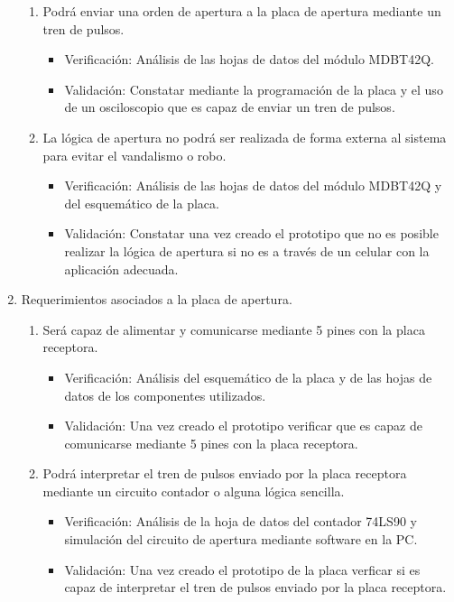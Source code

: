 \documentclass[11pt]{charter}
\begin{document}
\begin{enumerate}
\begin{enumerate}
	\item Podrá enviar una orden de apertura a la placa de apertura mediante un tren de pulsos.
		\begin{itemize}
		\item Verificación: Análisis de las hojas de datos del módulo MDBT42Q.
		\item Validación: Constatar mediante la programación de la placa y el uso de un osciloscopio que es capaz de enviar un tren de pulsos.
		\end{itemize}
		
			\item La lógica de apertura no podrá ser realizada de forma externa al sistema para evitar el vandalismo o robo.
		\begin{itemize}
		\item Verificación: Análisis de las hojas de datos del módulo MDBT42Q y del esquemático de la placa.
		\item Validación: Constatar una vez creado el prototipo que no es posible realizar la lógica de apertura si no es a través de un celular con la aplicación adecuada.
		\end{itemize}
	\end{enumerate}
	
\item Requerimientos asociados a la placa de apertura.
	\begin{enumerate}
	\item Será capaz de alimentar y comunicarse mediante 5 pines con la placa receptora.
		\begin{itemize}
		\item Verificación: Análisis del esquemático de la placa y de las hojas de datos de los componentes utilizados. 
		\item Validación: Una vez creado el prototipo verificar que es capaz de comunicarse mediante 5 pines con la placa receptora.
		\end{itemize}

	\item Podrá interpretar el tren de pulsos enviado por la placa receptora mediante un circuito contador o alguna lógica sencilla.
		\begin{itemize}
		\item Verificación: Análisis de la hoja de datos del contador 74LS90 y simulación del circuito de apertura mediante software en la PC.
		\item Validación: Una vez creado el prototipo de la placa verficar si es capaz de interpretar el tren de pulsos enviado por la placa receptora.
		\end{itemize}


\end{enumerate}
\end{enumerate}
\end{document}
